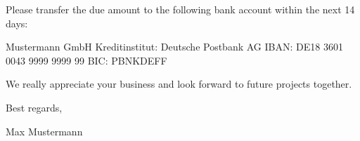 \documentclass[10pt, a4paper]{article}
\begin{document}
\vspace{15mm}

\sffamily
\small
Please transfer the due amount to the following bank account within the
next 14 days:

Mustermann GmbH Kreditinstitut: Deutsche Postbank AG IBAN: DE18 3601
0043 9999 9999 99 BIC: PBNKDEFF

We really appreciate your business and look forward to future projects
together.

Best regards,

\medskip

Max Mustermann
\end{document}
